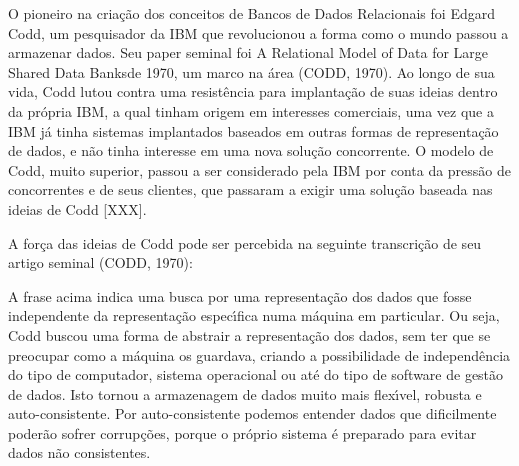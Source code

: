 \documentclass[
12pt,		%
openright,	%
twoside,  %
a4paper,			%
chapter=TITLE,		%
english,			%
french,				%
spanish,			%
brazil				%
]{USPSC-classe/USPSC}
\begin{document}
O pioneiro na cria\c{c}\~ao dos conceitos de Bancos de Dados Relacionais foi Edgard Codd, um pesquisador da IBM que revolucionou a forma como o mundo passou a armazenar dados. Seu paper seminal foi  \textquotedbl A Relational Model of Data for Large Shared Data Banks\textquotedbl  de 1970, um marco na \'area (CODD, 1970). Ao longo de sua vida, Codd lutou contra uma resist\^encia para implanta\c{c}\~ao de suas ideias dentro da pr\'opria IBM, a qual tinham origem em interesses comerciais, uma vez que a IBM j\'a tinha sistemas implantados baseados em outras formas de representa\c{c}\~ao de dados, e n\~ao tinha interesse em uma nova solu\c{c}\~ao concorrente. O modelo de Codd, muito superior, passou a ser considerado pela IBM por conta da press\~ao de concorrentes e de seus clientes, que passaram a exigir uma solu\c{c}\~ao baseada nas ideias de Codd [XXX].










A for\c{c}a das ideias de Codd pode ser percebida na seguinte transcri\c{c}\~ao de seu artigo seminal (CODD, 1970):











\noindent\begin{center}\mbox{\centering{}}\end{center}


A frase acima indica uma busca por uma representa\c{c}\~ao dos dados que fosse independente da representa\c{c}\~ao espec\'{\i}fica numa m\'aquina em particular. Ou seja, Codd buscou uma forma de abstrair a representa\c{c}\~ao dos dados, sem ter que se preocupar como a m\'aquina os guardava, criando a possibilidade de independ\^encia do tipo de computador, sistema operacional ou at\'e do tipo de software de gest\~ao de dados. Isto tornou a armazenagem de dados muito mais flex\'{\i}vel, robusta e auto-consistente. Por auto-consistente podemos entender dados que dificilmente poder\~ao sofrer corrup\c{c}\~oes, porque o pr\'oprio sistema \'e preparado para evitar dados n\~ao consistentes.
\end{document}
